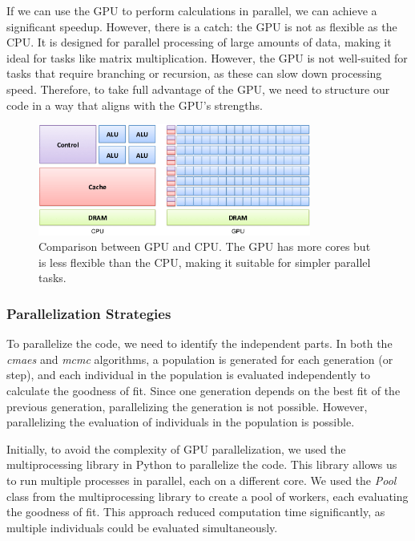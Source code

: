 \medskip

If we can use the GPU to perform calculations in parallel, we can achieve a significant speedup. However, there is a catch: the GPU is not as 
flexible as the CPU. It is designed for parallel processing of large amounts of data, making it ideal for tasks like matrix multiplication. However, 
the GPU is not well-suited for tasks that require branching or recursion, as these can slow down processing speed. Therefore, to take full advantage of 
the GPU, we need to structure our code in a way that aligns with the GPU's strengths.

\medskip

\begin{figure}[h]
    \centering
    \includegraphics[width=0.8\textwidth]{images/gpu_vs_cpu.png}
    \caption{Comparison between GPU and CPU. The GPU has more cores but is less flexible than the CPU, making it suitable for simpler parallel tasks. \cite{gpu_vs_cpu}}
\end{figure}

\subsubsection{Parallelization Strategies}

To parallelize the code, we need to identify the independent parts. In both the \textit{cmaes} and \textit{mcmc} algorithms, a population is generated 
for each generation (or step), and each individual in the population is evaluated independently to calculate the goodness of fit. Since one generation 
depends on the best fit of the previous generation, parallelizing the generation is not possible. However, parallelizing the evaluation of individuals 
in the population is possible.

\medskip

Initially, to avoid the complexity of GPU parallelization, we used the multiprocessing library in Python to parallelize the code. This library allows 
us to run multiple processes in parallel, each on a different core. We used the \textit{Pool} class from the multiprocessing library to create a pool 
of workers, each evaluating the goodness of fit. This approach reduced computation time significantly, as multiple individuals could be evaluated simultaneously.

